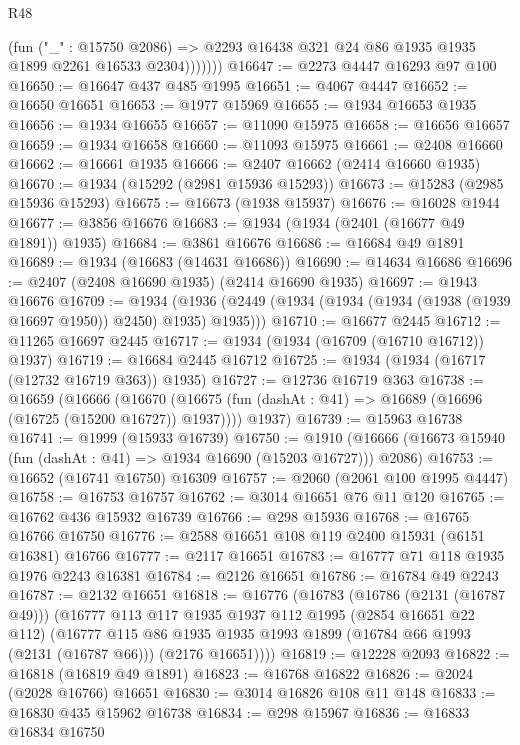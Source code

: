 \begin{lexlean}{R48}
\begin{coremodule}
                (fun ("_" : @15750 @2086) =>
                @2293 @16438 @321 @24 @86 @1935 @1935 @1899 @2261 @16533 @2304)))))))
@16647 := @2273 @4447 @16293 @97 @100
@16650 := @16647 @437 @485 @1995
@16651 := @4067 @4447
@16652 := @16650 @16651
@16653 := @1977 @15969
@16655 := @1934 @16653 @1935
@16656 := @1934 @16655
@16657 := @11090 @15975
@16658 := @16656 @16657
@16659 := @1934 @16658
@16660 := @11093 @15975
@16661 := @2408 @16660
@16662 := @16661 @1935
@16666 := @2407 @16662 (@2414 @16660 @1935)
@16670 := @1934 (@15292 (@2981 @15936 @15293))
@16673 := @15283 (@2985 @15936 @15293)
@16675 := @16673 (@1938 @15937)
@16676 := @16028 @1944
@16677 := @3856 @16676
@16683 := @1934 (@1934 (@2401 (@16677 @49 @1891)) @1935)
@16684 := @3861 @16676
@16686 := @16684 @49 @1891
@16689 := @1934 (@16683 (@14631 @16686))
@16690 := @14634 @16686
@16696 := @2407 (@2408 @16690 @1935) (@2414 @16690 @1935)
@16697 := @1943 @16676
@16709 := @1934
    (@1936 (@2449 (@1934 (@1934 (@1934 (@1938 (@1939 @16697 @1950)) @2450) @1935) @1935)))
@16710 := @16677 @2445
@16712 := @11265 @16697 @2445
@16717 := @1934 (@1934 (@16709 (@16710 @16712)) @1937)
@16719 := @16684 @2445 @16712
@16725 := @1934 (@1934 (@16717 (@12732 @16719 @363)) @1935)
@16727 := @12736 @16719 @363
@16738 := @16659
    (@16666
      (@16670 (@16675 (fun (dashAt : @41) => @16689 (@16696 (@16725 (@15200 @16727)) @1937))))
      @1937)
@16739 := @15963 @16738
@16741 := @1999 (@15933 @16739)
@16750 := @1910 (@16666 (@16673 @15940 (fun (dashAt : @41) => @1934 @16690 (@15203 @16727))) @2086)
@16753 := @16652 (@16741 @16750) @16309
@16757 := @2060 (@2061 @100 @1995 @4447)
@16758 := @16753 @16757
@16762 := @3014 @16651 @76 @11 @120
@16765 := @16762 @436 @15932 @16739
@16766 := @298 @15936
@16768 := @16765 @16766 @16750
@16776 := @2588 @16651 @108 @119 @2400 @15931 (@6151 @16381) @16766
@16777 := @2117 @16651
@16783 := @16777 @71 @118 @1935 @1976 @2243 @16381
@16784 := @2126 @16651
@16786 := @16784 @49 @2243
@16787 := @2132 @16651
@16818 := @16776
    (@16783
      (@16786 (@2131 (@16787 @49)))
      (@16777
        @113
        @117
        @1935
        @1937
        @112
        @1995
        (@2854 @16651 @22 @112)
        (@16777
          @115
          @86
          @1935
          @1935
          @1993
          @1899
          (@16784 @66 @1993 (@2131 (@16787 @66)))
          (@2176 @16651))))
@16819 := @12228 @2093
@16822 := @16818 (@16819 @49 @1891)
@16823 := @16768 @16822
@16826 := @2024 (@2028 @16766) @16651
@16830 := @3014 @16826 @108 @11 @148
@16833 := @16830 @435 @15962 @16738
@16834 := @298 @15967
@16836 := @16833 @16834 @16750

\end{coremodule}
\end{lexlean}

